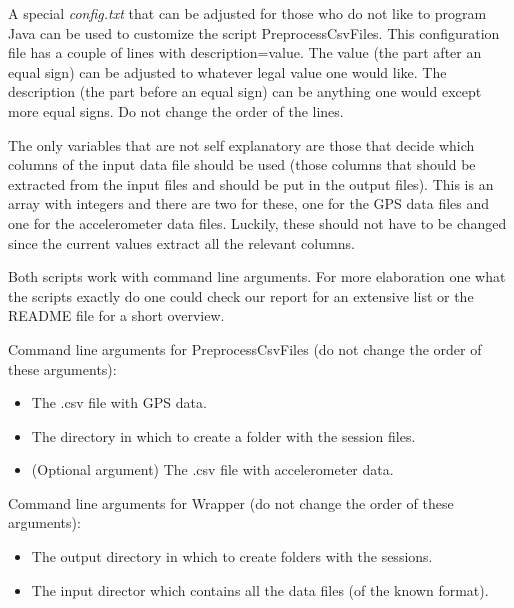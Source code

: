 A special \textit{config.txt} that can be adjusted for those who do not like to program 
Java can be used to customize the script PreprocessCsvFiles. This configuration file
has a couple of lines with description=value. The value (the part after an equal sign)
can be adjusted to whatever legal
value one
would like. The description (the part before an equal sign) can be anything one would
except more equal signs. Do not change the order of the lines.

The only variables that are not self explanatory are those that decide which columns
of the input data file should be used (those columns that should be extracted from the
input files and should be put in the output files). 
This is an array with integers and there are 
two for these, one for the GPS data files and one for the accelerometer data files. 
Luckily, these should not have to be changed since the current values extract all the 
relevant
columns. 

Both scripts work with command line arguments. For more elaboration one what the
scripts exactly do one could check our report for an extensive list or the README file for 
a short overview. 

Command line arguments for PreprocessCsvFiles (do not change the order of these arguments): 
\begin{itemize}
    \item The .csv file with GPS data.
    \item The directory in which to create a folder with the session files.
    \item (Optional argument) The .csv file with accelerometer data.
\end{itemize}

Command line arguments for Wrapper (do not change the order of these arguments): 
\begin{itemize}
    \item The output directory in which to create folders with the sessions.
    \item The input director which contains all the data files (of the known format). 
\end{itemize}

















